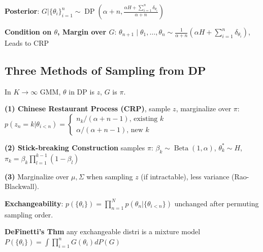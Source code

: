 \textbf{Posterior}: $G | \{\theta_{i}\}_{i=1}^n \sim \operatorname{DP}\left(\alpha+n, \frac{\alpha H + \sum_{i=1}^{n} \delta_{\theta_{i}}}{\alpha+n}\right)$

\textbf{Condition on $\theta$, Margin over $G$}: $\theta_{n+1} \mid \theta_{1}, \ldots, \theta_{n} \sim \frac{1}{\alpha+n}\left(\alpha H+\sum_{i=1}^{n} \delta_{\theta_{i}}\right)$, Leads to CRP

\subsection*{Three Methods of Sampling from DP}

In $K\to\infty$ GMM, $\theta$ in DP is $z$, $G$ is $\pi$. 

\textbf{(1) Chinese Restaurant Process (CRP)}, sample $z$, marginalize over $\pi$: \\
$p(z_n = k| \theta_{i < n}) = 
\begin{cases}
    n_k / (\alpha + n - 1) \text{, existing }k \\
    \alpha / (\alpha + n - 1) \text{, new }k 
\end{cases}
$

\textbf{(2) Stick-breaking Construction} samples $\pi$: $\beta_{k} \sim \operatorname{Beta}(1, \alpha)$, $\theta_{k}^{*} \sim H$, $\pi_{k}=\beta_{k} \prod_{l=1}^{k-1}\left(1-\beta_{l}\right)$

\textbf{(3)} Marginalize over $\mu, \Sigma$ when sampling $z$ (if intractable), less variance (Rao-Blackwall).

\textbf{Exchangeability}: $p(\{\theta_i\}) = \prod_{n=1}^N p(\theta_n | \{\theta_{i<n}\})$ unchanged after permuting sampling order.

\textbf{DeFinetti’s Thm} any exchangeable distri is a mixture model $P\left(\{\theta_{i}\}\right)=\int \prod_{i=1}^{n} G\left(\theta_{i}\right) d P(G)$
